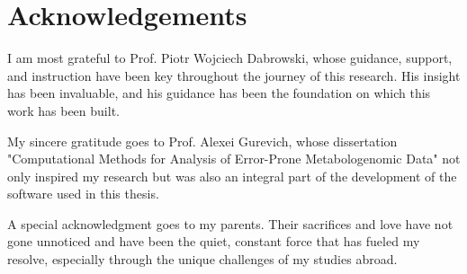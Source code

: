 \chapter*{Acknowledgements}


\vskip 1.0cm


I am most grateful to Prof. Piotr Wojciech Dabrowski, whose guidance, support, and instruction have been key throughout the journey of this research. His insight has been invaluable, and his guidance has been the foundation on which this work has been built.

My sincere gratitude goes to Prof. Alexei Gurevich, whose dissertation "Computational Methods for Analysis of Error-Prone Metabologenomic Data" not only inspired my research but was also an integral part of the development of the software used in this thesis.

A special acknowledgment goes to my parents. Their sacrifices and love have not gone unnoticed and have been the quiet, constant force that has fueled my resolve, especially through the unique challenges of my studies abroad. 